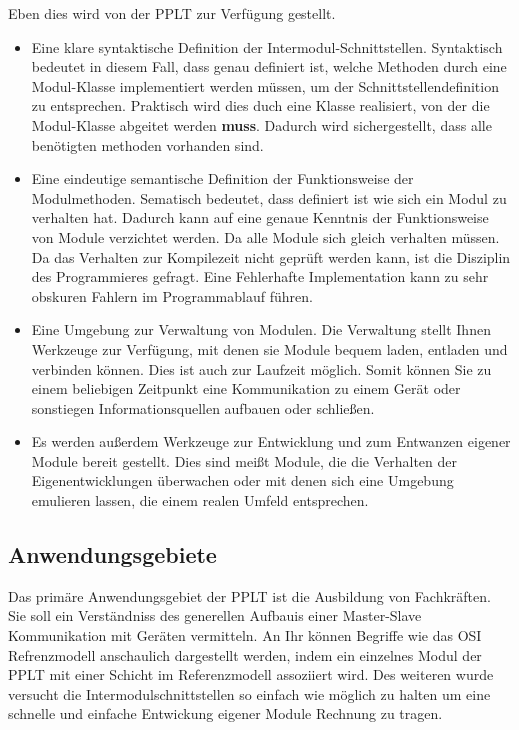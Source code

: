 \documentclass[a4paper,10pt]{book}
\begin{document}
    Eben dies wird von der PPLT zur Verfügung gestellt. 
    \begin{itemize}
    \item Eine klare syntaktische Definition der Intermodul-Schnittstellen. 
        Syntaktisch bedeutet in diesem Fall, dass genau definiert ist, welche
        Methoden durch eine Modul-Klasse implementiert werden müssen, um der 
        Schnittstellendefinition zu entsprechen. Praktisch wird dies duch eine
        Klasse realisiert, von der die Modul-Klasse abgeitet werden \textbf{muss}.
        Dadurch wird sichergestellt, dass alle benötigten methoden vorhanden 
        sind.
    \item Eine eindeutige semantische Definition der Funktionsweise der
        Modulmethoden. Sematisch bedeutet, dass definiert ist wie sich
        ein Modul zu verhalten hat. Dadurch kann auf eine genaue Kenntnis
        der Funktionsweise von Module verzichtet werden. Da alle Module sich
        gleich verhalten müssen. Da das Verhalten zur Kompilezeit nicht 
        geprüft werden kann, ist die Disziplin des Programmieres gefragt.
        Eine Fehlerhafte Implementation kann zu sehr obskuren Fahlern im
        Programmablauf führen.              
    \item Eine Umgebung zur Verwaltung von Modulen. Die Verwaltung stellt
        Ihnen Werkzeuge zur Verfügung, mit denen sie Module bequem laden,
        entladen und verbinden können.  Dies ist auch zur Laufzeit möglich.
        Somit können Sie zu einem beliebigen Zeitpunkt eine Kommunikation
        zu einem Gerät oder sonstiegen Informationsquellen aufbauen oder 
        schließen.
    \item Es werden außerdem Werkzeuge zur Entwicklung und zum Entwanzen
        eigener Module bereit gestellt. Dies sind meißt Module, die 
        die Verhalten der Eigenentwicklungen überwachen oder mit denen
        sich eine Umgebung emulieren lassen, die einem realen Umfeld 
        entsprechen.
    \end{itemize}
    
    
    \subsection{Anwendungsgebiete}
    Das primäre Anwendungsgebiet der PPLT ist die Ausbildung von Fachkräften.
    Sie soll ein Verständniss des generellen Aufbauis einer Master-Slave 
    Kommunikation mit Geräten vermitteln. An Ihr können Begriffe wie das OSI 
    Refrenzmodell anschaulich dargestellt werden, indem ein einzelnes Modul 
    der PPLT mit einer Schicht im Referenzmodell assoziiert wird. Des weiteren 
    wurde versucht die Intermodulschnittstellen so einfach wie möglich zu 
    halten um eine schnelle und einfache Entwickung eigener Module Rechnung zu 
    tragen. 
   
\end{document}
